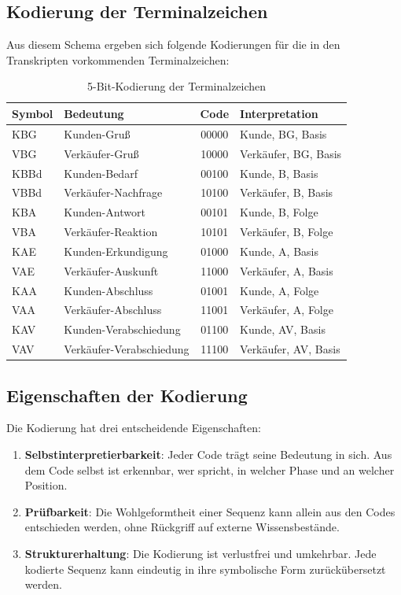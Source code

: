 \documentclass[
  12pt,
  a4paper,
  oneside,
  titlepage
]{article}
\begin{document}
\subsection{Kodierung der Terminalzeichen}

Aus diesem Schema ergeben sich folgende Kodierungen für die in den 
Transkripten vorkommenden Terminalzeichen:

\begin{table}[h]
\centering
\caption{5-Bit-Kodierung der Terminalzeichen}
\label{tab:kodierung}
\begin{tabular}{@{} l l c l @{}}
\toprule
\textbf{Symbol} & \textbf{Bedeutung} & \textbf{Code} & \textbf{Interpretation} \\
\midrule
KBG & Kunden-Gruß & 00000 & Kunde, BG, Basis \\
VBG & Verkäufer-Gruß & 10000 & Verkäufer, BG, Basis \\
KBBd & Kunden-Bedarf & 00100 & Kunde, B, Basis \\
VBBd & Verkäufer-Nachfrage & 10100 & Verkäufer, B, Basis \\
KBA & Kunden-Antwort & 00101 & Kunde, B, Folge \\
VBA & Verkäufer-Reaktion & 10101 & Verkäufer, B, Folge \\
KAE & Kunden-Erkundigung & 01000 & Kunde, A, Basis \\
VAE & Verkäufer-Auskunft & 11000 & Verkäufer, A, Basis \\
KAA & Kunden-Abschluss & 01001 & Kunde, A, Folge \\
VAA & Verkäufer-Abschluss & 11001 & Verkäufer, A, Folge \\
KAV & Kunden-Verabschiedung & 01100 & Kunde, AV, Basis \\
VAV & Verkäufer-Verabschiedung & 11100 & Verkäufer, AV, Basis \\
\bottomrule
\end{tabular}
\end{table}

\subsection{Eigenschaften der Kodierung}

Die Kodierung hat drei entscheidende Eigenschaften:

\begin{enumerate}
    \item \textbf{Selbstinterpretierbarkeit}: Jeder Code trägt seine 
    Bedeutung in sich. Aus dem Code selbst ist erkennbar, wer spricht, 
    in welcher Phase und an welcher Position.
    
    \item \textbf{Prüfbarkeit}: Die Wohlgeformtheit einer Sequenz kann 
    allein aus den Codes entschieden werden, ohne Rückgriff auf externe 
    Wissensbestände.
    
    \item \textbf{Strukturerhaltung}: Die Kodierung ist verlustfrei und 
    umkehrbar. Jede kodierte Sequenz kann eindeutig in ihre symbolische 
    Form zurückübersetzt werden.
\end{enumerate}
\end{document}
